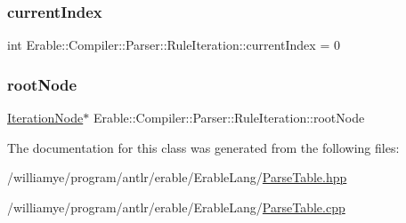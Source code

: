 \subsubsection{\texorpdfstring{currentIndex}{currentIndex}}
{\footnotesize\ttfamily int Erable\+::\+Compiler\+::\+Parser\+::\+Rule\+Iteration\+::current\+Index = 0}

\mbox{\label{class_erable_1_1_compiler_1_1_parser_1_1_rule_iteration_abde5cb07b4c7e8aa73bc636c082605a0}} 
\subsubsection{\texorpdfstring{rootNode}{rootNode}}
{\footnotesize\ttfamily \mbox{\hyperlink{struct_erable_1_1_compiler_1_1_parser_1_1_iteration_node}{Iteration\+Node}}$\ast$ Erable\+::\+Compiler\+::\+Parser\+::\+Rule\+Iteration\+::root\+Node}



The documentation for this class was generated from the following files\+:\begin{DoxyCompactItemize}
\item 
/williamye/program/antlr/erable/\+Erable\+Lang/\mbox{\hyperlink{_parse_table_8hpp}{Parse\+Table.\+hpp}}\item 
/williamye/program/antlr/erable/\+Erable\+Lang/\mbox{\hyperlink{_parse_table_8cpp}{Parse\+Table.\+cpp}}\end{DoxyCompactItemize}
